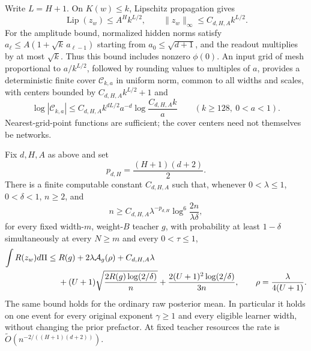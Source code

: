Write $L=H+1$.  On $K(w)\leq k$, Lipschitz propagation gives
\[
 \operatorname{Lip}(z_w)\leq A^H k^{L/2},\qquad
 \|z_w\|_\infty\leq C_{d,H,A}k^{L/2}.
\]
For the amplitude bound, normalized hidden norms satisfy
$a_\ell\leq A(1+\sqrt k\,a_{\ell-1})$ starting from
$a_0\leq\sqrt{d+1}$, and the readout multiplies by at most $\sqrt k$.
Thus this bound includes nonzero $\phi(0)$.
An input grid of mesh proportional to $a/k^{L/2}$, followed by rounding
values to multiples of $a$, provides a deterministic finite cover
$\mathcal C_{k,a}$ in uniform norm, common to all widths and scales,
with centers bounded by $C_{d,H,A}k^{L/2}+1$ and
\begin{equation}
 \log|\mathcal C_{k,a}|
 \leq C_{d,H,A} k^{dL/2}a^{-d}
                  \log\frac{C_{d,H,A}k}{a}
 \qquad(k\geq128,\ 0<a<1).
 \label{eq:general-activation-cover}
\end{equation}
Nearest-grid-point functions are sufficient; the cover centers need
not themselves be networks.

\begin{theorem}
\label{thm:general-activation-fixed-d}
Fix $d,H,A$ as above and set
\[
 p_{d,H}=\frac{(H+1)(d+2)}2.
\]
There is a finite computable constant $C_{d,H,A}$ such that, whenever
$0<\lambda\leq1$, $0<\delta<1$, $n\geq2$, and
\begin{equation}
 n\geq C_{d,H,A}\lambda^{-p_{d,H}}
             \log^6\!\frac{2n}{\lambda\delta},
 \label{eq:general-activation-budget}
\end{equation}
for every fixed width-$m$, weight-$B$ teacher $g$, with probability
at least $1-\delta$ simultaneously at every $N\geq m$ and every
$0<\tau\leq1$,
\begin{align}
 \int R(z_w)d\Pi
 \leq\;&R(g)+2\lambda\mathcal A_g(\rho)+C_{d,H,A}\lambda\notag\\
 &+(U+1)\sqrt{\frac{2R(g)\log(2/\delta)}n}
       +\frac{2(U+1)^2\log(2/\delta)}{3n},
 \qquad \rho=\frac\lambda{4(U+1)}.
 \label{eq:general-activation-oracle}
\end{align}
The same bound holds for the ordinary raw posterior mean.
In particular it holds on one event for every original exponent
$\gamma\geq1$ and every eligible learner width, without changing the
prior prefactor.  At fixed teacher resources the rate is
$\widetilde O(n^{-2/((H+1)(d+2))})$.
\end{theorem}

